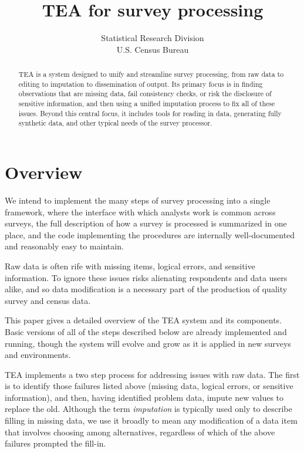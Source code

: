 \documentclass{article}
\begin{document}
\author{Statistical Research Division\\U.S. Census Bureau}
\title{TEA for survey processing}
\maketitle

\begin{abstract}
TEA is a system designed to unify and streamline survey processing, from raw data to
editing to imputation to dissemination of output. Its primary focus is in finding 
observations that are missing data, fail consistency checks, or risk the disclosure of
sensitive information, and then using a unified imputation process to fix all of these
issues. Beyond this central focus, it includes tools for reading in data, generating
fully synthetic data, and other typical needs of the survey processor.
\end{abstract}


\section{Overview}
{\sc We intend} to implement the many steps of survey processing into a single
framework, where the interface with which analysts work is common across surveys,
the full description of how a survey is processed is summarized in one place, and the
code implementing the procedures are internally well-documented and reasonably easy
to maintain.

Raw data is often rife with missing items, logical errors, and sensitive information. 
To ignore these issues risks alienating respondents and data users alike, and so data 
modification is a necessary part of the production of quality survey and census data.  

This paper gives a detailed overview of the TEA system and its components. 
Basic versions of all of the steps described below are already implemented and running,
though the system will evolve and grow as it is applied in new surveys and environments.

TEA implements a two step process for addressing issues with raw data. The first is to
identify those failures listed above (missing data, logical errors, or sensitive
information), and then, having identified problem data, impute new values
to replace the old. Although the term
{\em imputation} is typically used only to describe filling in missing data, we use it broadly to mean any modification of a data item that involves choosing
among alternatives, regardless of which of the above failures prompted the fill-in. 
\end{document}
